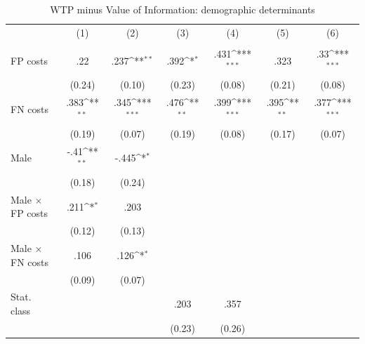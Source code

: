 \begin{table}[htbp]\centering
\def\sym#1{\ifmmode^{#1}\else\(^{#1}\)\fi}
\caption{WTP minus Value of Information: demographic determinants}
\begin{tabular}{l*{6}{c}}
\hline\hline
                &\multicolumn{1}{c}{(1)}&\multicolumn{1}{c}{(2)}&\multicolumn{1}{c}{(3)}&\multicolumn{1}{c}{(4)}&\multicolumn{1}{c}{(5)}&\multicolumn{1}{c}{(6)}\\
                &\multicolumn{1}{c}{}&\multicolumn{1}{c}{}&\multicolumn{1}{c}{}&\multicolumn{1}{c}{}&\multicolumn{1}{c}{}&\multicolumn{1}{c}{}\\
\hline
FP costs        &      .22         &     .237\sym{**} &     .392\sym{*}  &     .431\sym{***}&     .323         &      .33\sym{***}\\
                &   (0.24)         &   (0.10)         &   (0.23)         &   (0.08)         &   (0.21)         &   (0.08)         \\
FN costs        &     .383\sym{**} &     .345\sym{***}&     .476\sym{**} &     .399\sym{***}&     .395\sym{**} &     .377\sym{***}\\
                &   (0.19)         &   (0.07)         &   (0.19)         &   (0.08)         &   (0.17)         &   (0.07)         \\
Male            &     -.41\sym{**} &    -.445\sym{*}  &                  &                  &                  &                  \\
                &   (0.18)         &   (0.24)         &                  &                  &                  &                  \\
Male $\times$ FP costs&     .211\sym{*}  &     .203         &                  &                  &                  &                  \\
                &   (0.12)         &   (0.13)         &                  &                  &                  &                  \\
Male $\times$ FN costs&     .106         &     .126\sym{*}  &                  &                  &                  &                  \\
                &   (0.09)         &   (0.07)         &                  &                  &                  &                  \\
Stat. class     &                  &                  &     .203         &     .357         &                  &                  \\
                &                  &                  &   (0.23)         &   (0.26)         &                  &                  \\

\end{tabular}
\end{table}

